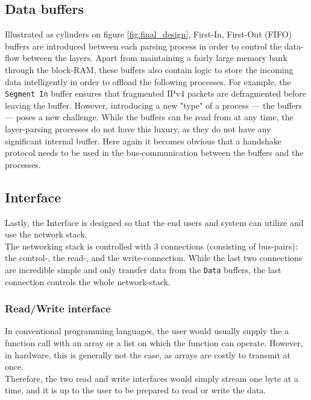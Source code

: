 \subsection{Data buffers} \label{sec:data_buffers}
Illustrated as cylinders on figure \ref{fig:final_design}, First-In, First-Out (FIFO)
buffers are introduced between each parsing process in order to control the data-flow 
between the layers. Apart from maintaining a fairly large memory bank through 
the block-RAM, these buffers also contain logic to store the incoming data
intelligently in order to offload the following processes. For example, the
\texttt{Segment In} buffer ensures that fragmented IPv4 packets are defragmented
before leaving the buffer.
However, introducing a new "type" of a process --- the buffers --- poses a new 
challenge. While the buffers can be read from at any time, the layer-parsing
processes do not have this luxury, as they do not have any significant internal
buffer. Here again it becomes obvious that a handshake protocol needs to be used 
in the bus-communication between the buffers and the processes.


\subsection{Interface}
Lastly, the Interface is designed so that the end users and system can utilize
and use the network stack.\\
The networking stack is controlled with 3 connections (consisting of bus-pairs): 
the control-, the read-, and the write-connection. While the last two connections 
are incredible simple and only transfer data from the \texttt{Data} buffers, 
the last connection controls the whole network-stack.

\subsubsection{Read/Write interface}
In conventional programming languages, the user would usually supply the a 
function call with an array or a list on which the function can operate.
However, in hardware, this is generally not the case, as arrays are costly to 
transmit at once.\\
Therefore, the two read and write interfaces would simply stream one byte at a 
time, and it is up to the user to be prepared to read or write the data.


